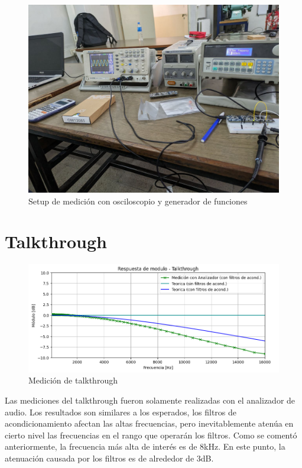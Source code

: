 \documentclass[11pt,a4paper]{report}
\begin{document}
\begin{figure}[h]
    \centering
    \includegraphics[scale=0.3]{figs/setup.jpg}
    \caption{Setup de medición con osciloscopio y generador de funciones}
\end{figure}

\pagebreak

\section{Talkthrough}

\begin{figure}[h]
    \centering
    \includegraphics[scale=0.7]{figs/talkthrough.png}
    \caption{Medición de talkthrough}
\end{figure}

Las mediciones del talkthrough fueron solamente realizadas con el analizador de audio. Los resultados son similares a los esperados, los filtros de acondicionamiento afectan las altas frecuencias, pero inevitablemente atenúa en cierto nivel las frecuencias en el rango que operarán los filtros. Como se comentó anteriormente, la frecuencia más alta de interés es de 8kHz. En este punto, la atenuación causada por los filtros es de alrededor de 3dB.
\end{document}
